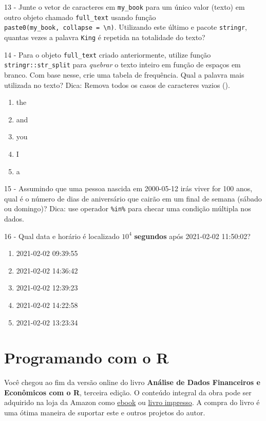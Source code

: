 \documentclass[
  11pt,
]{book}
\providecommand{\tightlist}{%
  \setlength{\itemsep}{0pt}\setlength{\parskip}{0pt}}
\newenvironment{pleasebuyit}
{\begin{noteblock}
		
	} {\end{noteblock}}
\begin{document}
13 -
Junte o vetor de caracteres em \texttt{my\_book} para um único valor (texto) em outro objeto chamado \texttt{full\_text} usando função \texttt{paste0(my\_book,\ collapse\ =\ \textquotesingle{}\textbackslash{}n\textquotesingle{})}. Utilizando este último e pacote \texttt{stringr}, quantas vezes a palavra \texttt{\textquotesingle{}King\textquotesingle{}} é repetida na totalidade do texto?

14 -
Para o objeto \texttt{full\_text} criado anteriormente, utilize função \texttt{stringr::str\_split} para \emph{quebrar} o texto inteiro em função de espaços em branco. Com base nesse, crie uma tabela de frequência. Qual a palavra mais utilizada no texto? Dica: Remova todos os casos de caracteres vazios (\texttt{\textquotesingle{}\textquotesingle{}}).

\begin{enumerate}
\def\labelenumi{\alph{enumi})}
\tightlist
\item
  the
\item
  and
\item
  you
\item
  I
\item
  a
\end{enumerate}

15 -
Assumindo que uma pessoa nascida em 2000-05-12 irás viver for 100 anos, qual é o número de dias de aniversário que cairão em um final de semana (sábado ou domingo)? Dica: use operador \texttt{\%in\%} para checar uma condição múltipla nos dados.

16 -
Qual data e horário é localizado \ensuremath{10^{4}} \textbf{segundos} após 2021-02-02 11:50:02?

\begin{enumerate}
\def\labelenumi{\alph{enumi})}
\tightlist
\item
  2021-02-02 09:39:55
\item
  2021-02-02 14:36:42
\item
  2021-02-02 12:39:23
\item
  2021-02-02 14:22:58
\item
  2021-02-02 13:23:34
\end{enumerate}

\hypertarget{programacao}{%
\chapter{Programando com o R}\label{programacao}}

\begin{pleasebuyit}
Você chegou ao fim da versão online do livro \textbf{Análise de Dados
Financeiros e Econômicos com o R}, terceira edição. O conteúdo integral
da obra pode ser adquirido na loja da Amazon como
\href{https://www.amazon.com.br/dp/B08WNC27ZY}{ebook} ou
\href{https://www.amazon.com/dp/B08WP8CCDB}{livro impresso}. A compra do
livro é uma ótima maneira de suportar este e outros projetos do autor.
\end{pleasebuyit}
\end{document}
